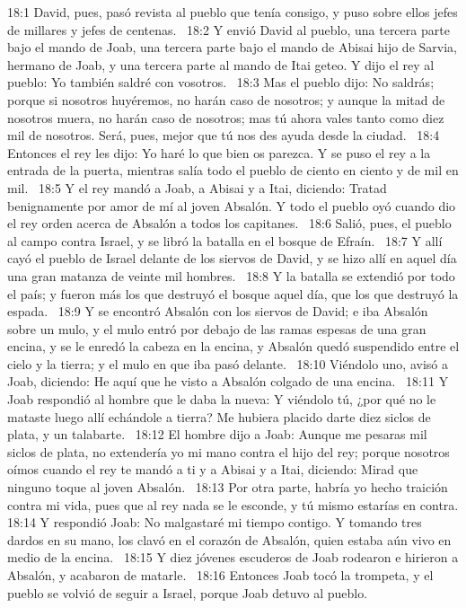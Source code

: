 18:1 David, pues, pasó revista al pueblo que tenía consigo, y puso sobre ellos jefes de millares y jefes de centenas.  
18:2 Y envió David al pueblo, una tercera parte bajo el mando de Joab, una tercera parte bajo el mando de Abisai hijo de Sarvia, hermano de Joab, y una tercera parte al mando de Itai geteo. Y dijo el rey al pueblo: Yo también saldré con vosotros.  
18:3 Mas el pueblo dijo: No saldrás; porque si nosotros huyéremos, no harán caso de nosotros; y aunque la mitad de nosotros muera, no harán caso de nosotros; mas tú ahora vales tanto como diez mil de nosotros. Será, pues, mejor que tú nos des ayuda desde la ciudad.  
18:4 Entonces el rey les dijo: Yo haré lo que bien os parezca. Y se puso el rey a la entrada de la puerta, mientras salía todo el pueblo de ciento en ciento y de mil en mil.  
18:5 Y el rey mandó a Joab, a Abisai y a Itai, diciendo: Tratad benignamente por amor de mí al joven Absalón. Y todo el pueblo oyó cuando dio el rey orden acerca de Absalón a todos los capitanes.  
18:6 Salió, pues, el pueblo al campo contra Israel, y se libró la batalla en el bosque de Efraín.  
18:7 Y allí cayó el pueblo de Israel delante de los siervos de David, y se hizo allí en aquel día una gran matanza de veinte mil hombres.  
18:8 Y la batalla se extendió por todo el país; y fueron más los que destruyó el bosque aquel día, que los que destruyó la espada.  
18:9 Y se encontró Absalón con los siervos de David; e iba Absalón sobre un mulo, y el mulo entró por debajo de las ramas espesas de una gran encina, y se le enredó la cabeza en la encina, y Absalón quedó suspendido entre el cielo y la tierra; y el mulo en que iba pasó delante.  
18:10 Viéndolo uno, avisó a Joab, diciendo: He aquí que he visto a Absalón colgado de una encina.  
18:11 Y Joab respondió al hombre que le daba la nueva: Y viéndolo tú, ¿por qué no le mataste luego allí echándole a tierra? Me hubiera placido darte diez siclos de plata, y un talabarte.  
18:12 El hombre dijo a Joab: Aunque me pesaras mil siclos de plata, no extendería yo mi mano contra el hijo del rey; porque nosotros oímos cuando el rey te mandó a ti y a Abisai y a Itai, diciendo: Mirad que ninguno toque al joven Absalón.  
18:13 Por otra parte, habría yo hecho traición contra mi vida, pues que al rey nada se le esconde, y tú mismo estarías en contra. 
18:14 Y respondió Joab: No malgastaré mi tiempo contigo. Y tomando tres dardos en su mano, los clavó en el corazón de Absalón, quien estaba aún vivo en medio de la encina.  
18:15 Y diez jóvenes escuderos de Joab rodearon e hirieron a Absalón, y acabaron de matarle.  
18:16 Entonces Joab tocó la trompeta, y el pueblo se volvió de seguir a Israel, porque Joab detuvo al pueblo.  
